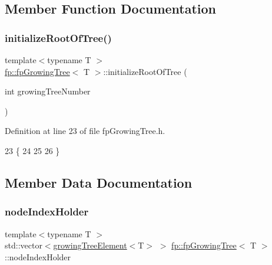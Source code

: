 \subsection{Member Function Documentation}
\mbox{\label{classfp_1_1fpGrowingTree_a5762c272db68e2e28c767053f752418f}} 
\subsubsection{\texorpdfstring{initialize\+Root\+Of\+Tree()}{initializeRootOfTree()}}
{\footnotesize\ttfamily template$<$typename T $>$ \\
\hyperlink{classfp_1_1fpGrowingTree}{fp\+::fp\+Growing\+Tree}$<$ T $>$\+::initialize\+Root\+Of\+Tree (\begin{DoxyParamCaption}\item[{int}]{growing\+Tree\+Number }\end{DoxyParamCaption})\hspace{0.3cm}{\ttfamily [inline]}}



Definition at line 23 of file fp\+Growing\+Tree.\+h.


\begin{DoxyCode}
23                                                                   \{
24 
25 
26                 \}
\end{DoxyCode}


\subsection{Member Data Documentation}
\mbox{\label{classfp_1_1fpGrowingTree_ad729a18d4cd23d38a5bcab4bdd1ed58b}} 
\subsubsection{\texorpdfstring{node\+Index\+Holder}{nodeIndexHolder}}
{\footnotesize\ttfamily template$<$typename T $>$ \\
std\+::vector$<$\hyperlink{classfp_1_1growingTreeElement}{growing\+Tree\+Element}$<$T$>$ $>$ \hyperlink{classfp_1_1fpGrowingTree}{fp\+::fp\+Growing\+Tree}$<$ T $>$\+::node\+Index\+Holder\hspace{0.3cm}{\ttfamily [protected]}}



